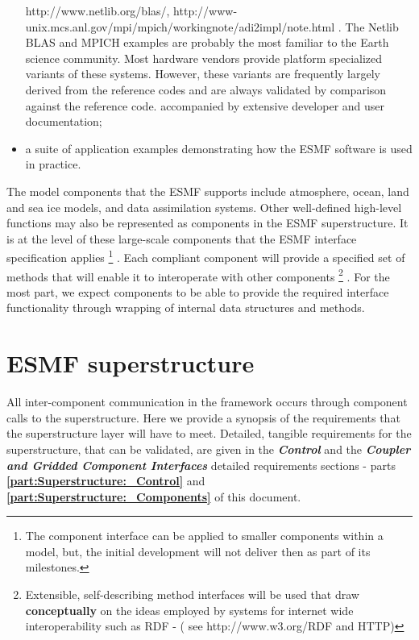 \begin{itemize}
{http://www.netlib.org/blas/, http://www-unix.mcs.anl.gov/mpi/mpich/workingnote/adi2impl/note.html . The Netlib BLAS and MPICH
examples are probably the most familiar to the Earth science community. Most hardware vendors provide platform specialized variants
of these systems. However, these variants are frequently largely derived from the reference codes and are always validated by
comparison against the reference code.
}
  accompanied by extensive developer and user documentation;
\item a suite of application examples demonstrating how the ESMF
  software is used in practice.
\end{itemize}

The model components that the ESMF supports include atmosphere, ocean,
land and sea ice models, and data assimilation systems. Other
well-defined high-level functions may also be represented as
components in the ESMF superstructure.  It is at the level of these
large-scale components that the ESMF interface specification applies
\footnote{
The component interface can be applied to smaller components within a model,
but, the initial development will not deliver then as part of its milestones.
}
.
Each compliant component will provide a specified set of methods that
will enable it to interoperate with other components \footnote{
Extensible, self-describing method interfaces will be used that draw
{\bf conceptually} on the ideas employed by systems for internet
wide interoperability such as RDF - ( see http://www.w3.org/RDF and HTTP)
}
.  For the most
part, we expect components to be able to provide the required
interface functionality through wrapping of internal data structures
and methods. 

\section{ESMF superstructure}
\label{sec:ESMF_superstructure}

All inter-component communication in the framework occurs through 
component calls to the superstructure. Here we provide a synopsis of the
requirements that the superstructure layer will have to meet.
Detailed, tangible requirements for the superstructure, that can
be validated, are given in the {\bf \it Control} and the {\bf \it Coupler and
Gridded Component Interfaces} detailed requirements sections -
parts {\bf \ref{part:Superstructure:_Control}} and {\bf \ref{part:Superstructure:_Components}} 
of this document. \\

